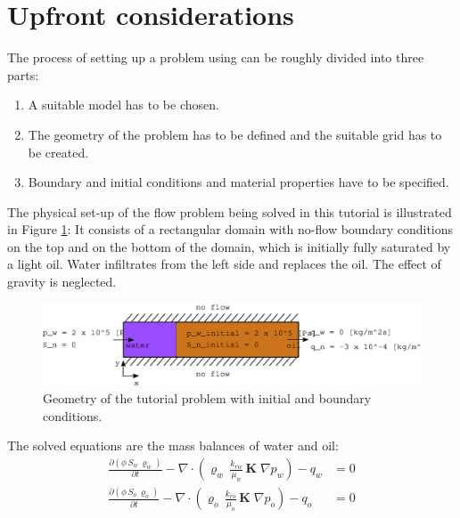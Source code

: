 \section{Upfront considerations}
\label{tutorial1}

The process of setting up a problem using \eWoms can be roughly
divided into three parts:
\begin{enumerate}
\item A suitable model has to be chosen.
\item The geometry of the problem has to be defined and the suitable
  grid has to be created.
\item Boundary and initial conditions and material properties have to
  be specified.
\end{enumerate}

The physical set-up of the flow problem being solved in this tutorial
is illustrated in Figure \ref{tutorial1:problemfigure}: It
consists of a rectangular domain with no-flow boundary conditions on
the top and on the bottom of the domain, which is initially fully
saturated by a light oil. Water infiltrates from the left side and
replaces the oil. The effect of gravity is neglected.

\begin{figure}[ht]
\centering
\includegraphics[width=0.9\linewidth,keepaspectratio]{EPS/tutorial-problemconfiguration}
\caption{Geometry of the tutorial problem with initial and boundary conditions.}\label{tutorial1:problemfigure}
\end{figure}

The solved equations are the mass balances of water and oil:
\begin{align}
  \label{massbalancewater}
  \frac {\partial (\phi \, S_{w}\, \varrho_{w})}{\partial t}
  -
  \nabla \cdot \left( \varrho_{w} \, \frac{k_{rw}}{\mu_{w}} \, \mathbf{K}\;\nabla p_w \right)
  -
  q_w
  & =
  0 \\
  \label{massbalanceoil}
  \frac {\partial (\phi \, S_{o}\, \varrho_{o})}{\partial t}
  -
  \nabla \cdot \left( \varrho_{o} \, \frac{k_{ro}}{\mu_{o}} \, \mathbf{K}\;\nabla p_o \right)
  -
  q_o 
  & =
  0
\end{align}


